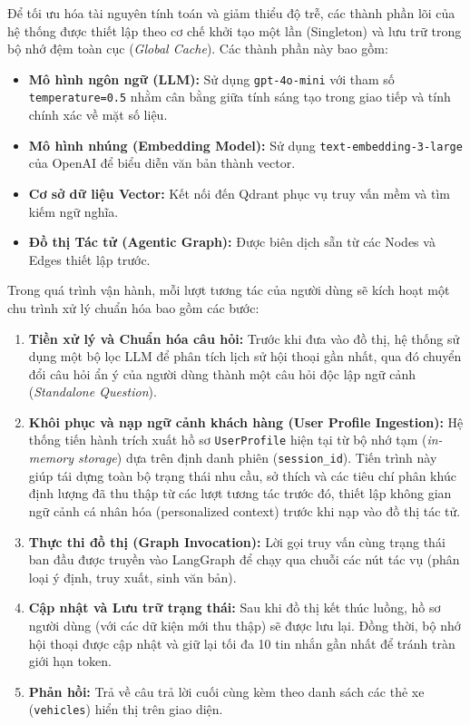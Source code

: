 Để tối ưu hóa tài nguyên tính toán và giảm thiểu độ trễ, các thành phần lõi của hệ thống được thiết lập theo cơ chế khởi tạo một lần (Singleton) và lưu trữ trong bộ nhớ đệm toàn cục (\textit{Global Cache}). Các thành phần này bao gồm:
\begin{itemize}
    \item \textbf{Mô hình ngôn ngữ (LLM):} Sử dụng \texttt{gpt-4o-mini} với tham số \texttt{temperature=0.5} nhằm cân bằng giữa tính sáng tạo trong giao tiếp và tính chính xác về mặt số liệu.
    \item \textbf{Mô hình nhúng (Embedding Model):} Sử dụng \texttt{text-embedding-3-large} của OpenAI để biểu diễn văn bản thành vector.
    \item \textbf{Cơ sở dữ liệu Vector:} Kết nối đến Qdrant phục vụ truy vấn mềm và tìm kiếm ngữ nghĩa.
    \item \textbf{Đồ thị Tác tử (Agentic Graph):} Được biên dịch sẵn từ các Nodes và Edges thiết lập trước.
\end{itemize}

Trong quá trình vận hành, mỗi lượt tương tác của người dùng sẽ kích hoạt một chu trình xử lý chuẩn hóa bao gồm các bước:
\begin{enumerate}
    \item \textbf{Tiền xử lý và Chuẩn hóa câu hỏi:} Trước khi đưa vào đồ thị, hệ thống sử dụng một bộ lọc LLM để phân tích lịch sử hội thoại gần nhất, qua đó chuyển đổi câu hỏi ẩn ý của người dùng thành một câu hỏi độc lập ngữ cảnh (\textit{Standalone Question}). 
    \item \textbf{Khôi phục và nạp ngữ cảnh khách hàng (User Profile Ingestion):} Hệ thống tiến hành trích xuất hồ sơ \texttt{UserProfile} hiện tại từ bộ nhớ tạm (\textit{in-memory storage}) dựa trên định danh phiên (\texttt{session\_id}). Tiến trình này giúp tái dựng toàn bộ trạng thái nhu cầu, sở thích và các tiêu chí phân khúc định lượng đã thu thập từ các lượt tương tác trước đó, thiết lập không gian ngữ cảnh cá nhân hóa (personalized context) trước khi nạp vào đồ thị tác tử.
    \item \textbf{Thực thi đồ thị (Graph Invocation):} Lời gọi truy vấn cùng trạng thái ban đầu được truyền vào LangGraph để chạy qua chuỗi các nút tác vụ (phân loại ý định, truy xuất, sinh văn bản).
    \item \textbf{Cập nhật và Lưu trữ trạng thái:} Sau khi đồ thị kết thúc luồng, hồ sơ người dùng (với các dữ kiện mới thu thập) sẽ được lưu lại. Đồng thời, bộ nhớ hội thoại được cập nhật và giữ lại tối đa 10 tin nhắn gần nhất để tránh tràn giới hạn token.
    \item \textbf{Phản hồi:} Trả về câu trả lời cuối cùng kèm theo danh sách các thẻ xe (\texttt{vehicles}) hiển thị trên giao diện.
\end{enumerate}


